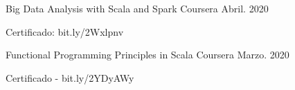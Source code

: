 

\begin{cventries}

  \cventry
    {} %
    {Big Data Analysis with Scala and Spark} %
    {Coursera} %
    {Abril. 2020} %
    {
      \begin{cvitems} %
        \item {Certificado: bit.ly/2Wxlpnv}
      \end{cvitems}
    }

  \cventry
    {} %
    {Functional Programming Principles in Scala} %
    {Coursera} %
    {Marzo. 2020} %
    {
      \begin{cvitems} %
        \item {Certificado - bit.ly/2YDyAWy}
      \end{cvitems}
    }


\end{cventries}
